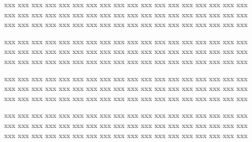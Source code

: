 \documentclass[10pt,twoside%
	]{article}
\begin{document}
xxx xxx xxx xxx xxx xxx xxx xxx xxx xxx xxx xxx xxx xxx xxx xxx xxx xxx 
xxx xxx xxx xxx xxx xxx xxx xxx xxx xxx xxx xxx xxx xxx xxx xxx xxx xxx 
xxx xxx xxx xxx xxx xxx xxx xxx xxx xxx xxx xxx xxx xxx xxx xxx xxx xxx 

xxx xxx xxx xxx xxx xxx xxx xxx xxx xxx xxx xxx xxx xxx xxx xxx xxx xxx 
xxx xxx xxx xxx xxx xxx xxx xxx xxx xxx xxx xxx xxx xxx xxx xxx xxx xxx 
xxx xxx xxx xxx xxx xxx xxx xxx xxx xxx xxx xxx xxx xxx xxx xxx xxx xxx 

xxx xxx xxx xxx xxx xxx xxx xxx xxx xxx xxx xxx xxx xxx xxx xxx xxx xxx 
xxx xxx xxx xxx xxx xxx xxx xxx xxx xxx xxx xxx xxx xxx xxx xxx xxx xxx 
xxx xxx xxx xxx xxx xxx xxx xxx xxx xxx xxx xxx xxx xxx xxx xxx xxx xxx 

xxx xxx xxx xxx xxx xxx xxx xxx xxx xxx xxx xxx xxx xxx xxx xxx xxx xxx 
xxx xxx xxx xxx xxx xxx xxx xxx xxx xxx xxx xxx xxx xxx xxx xxx xxx xxx 
xxx xxx xxx xxx xxx xxx xxx xxx xxx xxx xxx xxx xxx xxx xxx xxx xxx xxx 






\end{document}
